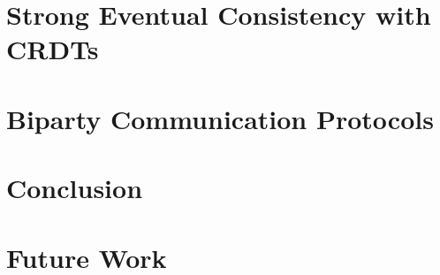 \clearpage
\section{Strong Eventual Consistency with CRDTs}
\label{crdt}


\clearpage
\section{Biparty Communication Protocols}
\label{biparty}


\clearpage
\section{Conclusion}
\label{conclusion}


\section{Future Work}
\label{futurework}


\appendix

\clearpage

\nocite{*}




